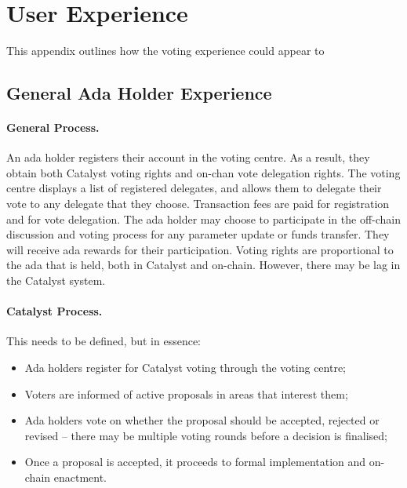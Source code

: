 \pagebreak
\section{User Experience}
\label{sect:ux}

This appendix outlines how the voting experience could appear to

\subsection{General Ada Holder Experience}

\paragraph{General Process.} An ada holder registers their account in the voting centre.  As a result, they obtain both Catalyst voting rights and on-chan vote delegation rights.
The voting centre displays a list of registered delegates, and allows them to delegate their vote to any delegate that they choose.  Transaction
fees are paid for registration and for vote delegation.  The ada holder may choose to participate in the off-chain discussion and voting process for any
parameter update or funds transfer. They will receive ada rewards for their participation.
Voting rights are proportional to the ada that is held, both in Catalyst and on-chain.  However, there may be lag in the Catalyst system.

\paragraph{Catalyst Process.}

This needs to be defined, but in essence:

\begin{itemize}
\item
  Ada holders register for Catalyst voting through the voting centre;
\item
  Voters are informed of active proposals in areas that interest them;
\item
  Ada holders vote on whether the proposal should be accepted, rejected or revised -- there may be multiple voting rounds
  before a decision is finalised;
\item
  Once a proposal is accepted, it proceeds to formal implementation and on-chain enactment.
\end{itemize}

